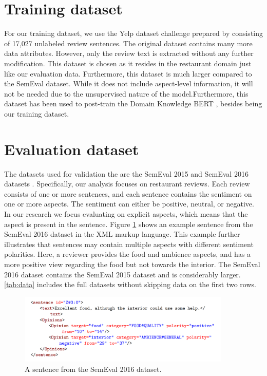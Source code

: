 \documentclass[american, oneside]{ecsgdp}
\begin{document}
\section{Training dataset} \label{sec:training_data}
For our training dataset, we use the Yelp dataset challenge prepared by \textcite{Huang2020JASen} consisting of 17,027 unlabeled review sentences. The original dataset \parencite{Tang2016Yelp} contains many more data attributes. However, only the review text is extracted without any further modification. This dataset is chosen as it resides in the restaurant domain just like our evaluation data. Furthermore, this dataset is much larger compared to the SemEval dataset. While it does not include aspect-level information, it will not be needed due to the unsupervised nature of the model.Furthermore, this dataset has been used to post-train the Domain Knowledge BERT \parencite{Xu2019DKBERT}, besides being our training dataset.

\section{Evaluation dataset} \label{sec:evaluation_data}
The datasets used for validation the are the SemEval 2015 and SemEval 2016 datasets \parencite{Pontiki2015SemEval, Pontiki2016SemEval}. Specifically, our analysis focuses on restaurant reviews. Each review consists of one or more sentences, and each sentence contains the sentiment on one or more aspects. The sentiment can either be positive, neutral, or negative. In our research we focus evaluating on explicit aspects, which means that the aspect is present in the sentence. Figure \ref{fig:example_semeval} shows an example sentence from the SemEval 2016 dataset in the XML markup language. This example further illustrates that sentences may contain multiple aspects with different sentiment polarities. Here, a reviewer provides the food and ambience aspects, and has a more positive view regarding the food but not towards the interior.
The SemEval 2016 dataset contains the SemEval 2015 dataset and is considerably larger. \cref{tab:data} includes the full datasets without skipping data on the first two rows.

\begin{figure}[htbp]
    \centering
    \includegraphics[width=0.9\textwidth]{example_semeval.PNG}
    \caption{A sentence from the SemEval 2016 dataset.}
    \label{fig:example_semeval}
\end{figure}
\end{document}
